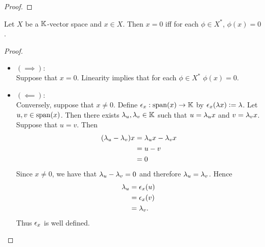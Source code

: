 \documentclass{book}
\begin{document}
 \begin{ex}
 \end{ex}
 
 \begin{proof}
 	
 \end{proof}
 
 \begin{ex}
 	
 \end{ex}
 
 
 \begin{ex}
 	Let $X$ be a $\mathbb{K}$-vector space and $x \in X$. Then $x = 0$ iff for each $\phi \in X^*$, $\phi(x) = 0$. 
 \end{ex}
 
 \begin{proof}\
 	\begin{itemize}
 		\item $(\implies):$ \\
 		Suppose that $x = 0$. Linearity implies that for each $\phi \in X^*$ $\phi(x) = 0$. 
 		\item $(\impliedby):$ \\
 		Conversely, suppose that $x \neq 0$. Define $\epsilon_x: \operatorname{span}(x) \rightarrow \mathbb{K}$ by $\epsilon_x(\lambda x) \vcentcolon= \lambda$. Let $u,v \in \operatorname{span}(x)$. Then there exists $\lambda_u, \lambda_v \in \mathbb{K}$ such that $u = \lambda_u x$ and $v = \lambda_v x$. Suppose that $u = v$. Then 
 		\begin{align*}
 			(\lambda_u - \lambda_v)x
 			& = \lambda_u x - \lambda_v x \\
 			& = u - v \\
 			& = 0
 		\end{align*}
 		Since $x \neq 0$, we have that $\lambda_u - \lambda_v = 0$ and therefore $\lambda_u = \lambda_v$. Hence  
 		\begin{align*}
 			\lambda_u 
 			& = \epsilon_x(u) \\
 			& = \epsilon_x(v) \\
 			& = \lambda_v.
 		\end{align*}
 		Thus $\epsilon_x$ is well defined. 
 	\end{itemize}
 \end{proof}
 
 
 
 
 
 
 
 
 
 
 
 
 
 
 
\end{document}
